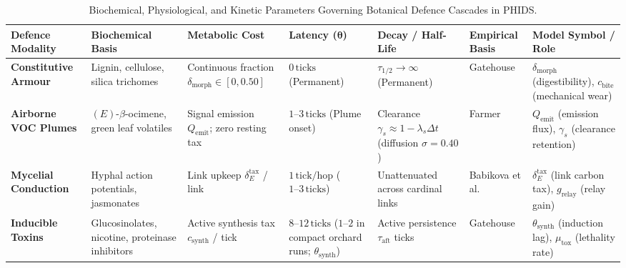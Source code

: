 \begin{table}[b]
\caption{Biochemical, Physiological, and Kinetic Parameters Governing Botanical Defence Cascades in PHIDS.}
\label{tab:biochemical_parameters}
\vspace{4pt}
\centering
\footnotesize
\begin{tabularx}{\textwidth}{
  >{\raggedright\hsize=0.90\hsize}X
  >{\raggedright\hsize=1.00\hsize}X
  >{\centering\hsize=0.95\hsize}X
  >{\centering\hsize=0.80\hsize}X
  >{\centering\hsize=0.90\hsize}X
  >{\raggedright\hsize=1.15\hsize}X
  >{\raggedright\arraybackslash\hsize=1.30\hsize}X
}
\toprule
\textbf{Defence Modality} &
\textbf{Biochemical Basis} &
\textbf{Metabolic Cost} &
\textbf{Latency ($\bm{\theta}$)} &
\textbf{Decay / Half-Life} &
\textbf{Empirical Basis} &
\textbf{Model Symbol / Role} \\
\midrule

\textbf{Constitutive Armour} &
Lignin, cellulose, silica trichomes &
Continuous fraction \newline $\delta_{\mathrm{morph}} \in [0, 0.50]$ &
$0\,\text{ticks}$ (Permanent) &
$\tau_{1/2} \to \infty$ (Permanent) &
Gatehouse \cite{gatehouse2002plant} &
$\delta_{\mathrm{morph}}$ (digestibility), \newline
$c_{\mathrm{bite}}$ (mechanical wear) \\

\textbf{Airborne VOC Plumes} &
$(E)$-$\beta$-ocimene, green leaf volatiles &
Signal emission $Q_{\mathrm{emit}}$; zero resting tax &
$1\text{--}3\,\text{ticks}$ (Plume onset) &
Clearance $\gamma_s \approx 1 - \lambda_s\Delta t$ (diffusion $\sigma = 0.40$) &
Farmer \cite{farmer2001surface} &
$Q_{\mathrm{emit}}$ (emission flux), \newline
$\gamma_s$ (clearance retention) \\

\textbf{Mycelial Conduction} &
Hyphal action potentials, jasmonates &
Link upkeep $\delta_E^{\mathrm{tax}}$ / link &
$1\,\text{tick/hop}$ ($1\text{--}3\,\text{ticks}$) &
Unattenuated across cardinal links &
Babikova et al. \cite{babikova2013underground} &
$\delta_E^{\mathrm{tax}}$ (link carbon tax), \newline
$g_{\mathrm{relay}}$ (relay gain) \\

\textbf{Inducible Toxins} &
Glucosinolates, nicotine, proteinase inhibitors &
Active synthesis tax $c_{\mathrm{synth}}$ / tick &
$8\text{--}12\,\text{ticks}$ ($1\text{--}2$ in compact orchard runs; $\theta_{\mathrm{synth}}$) &
Active persistence $\tau_{\mathrm{aft}}$ ticks &
Gatehouse \cite{gatehouse2002plant} &
$\theta_{\mathrm{synth}}$ (induction lag), \newline
$\mu_{\mathrm{tox}}$ (lethality rate) \\


\end{tabularx}
\end{table}
